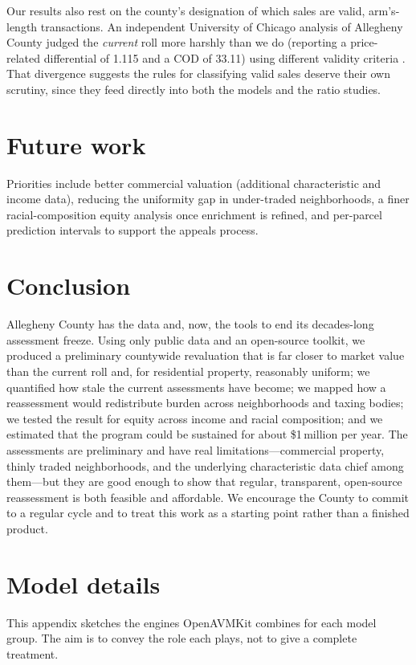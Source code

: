 \documentclass[11pt]{article}
\begin{document}
Our results also rest on the county's designation of which sales are valid,
arm's-length transactions. An independent University of Chicago analysis of
Allegheny County judged the \emph{current} roll more harshly than we do (reporting
a price-related differential of 1.115 and a COD of 33.11) using different validity
criteria \citep{berry2024}. That divergence suggests the rules for classifying
valid sales deserve their own scrutiny, since they feed directly into both the
models and the ratio studies.

\section{Future work}\label{sec:future}
Priorities include better commercial valuation (additional characteristic and
income data), reducing the uniformity gap in under-traded neighborhoods, a finer
racial-composition equity analysis once enrichment is refined, and per-parcel
prediction intervals to support the appeals process.

\section{Conclusion}
Allegheny County has the data and, now, the tools to end its decades-long
assessment freeze. Using only public data and an open-source toolkit, we produced a
preliminary countywide revaluation that is far closer to market value than the
current roll and, for residential property, reasonably uniform; we quantified how
stale the current assessments have become; we mapped how a reassessment would
redistribute burden across neighborhoods and taxing bodies; we tested the result
for equity across income and racial composition; and we estimated that the program
could be sustained for about \$1\,million per year. The assessments are preliminary
and have real limitations---commercial property, thinly traded neighborhoods, and
the underlying characteristic data chief among them---but they are good enough to
show that regular, transparent, open-source reassessment is both feasible and
affordable. We encourage the County to commit to a regular cycle and to treat this
work as a starting point rather than a finished product.

\appendix
\section{Model details}
This appendix sketches the engines OpenAVMKit combines for each model group. The
aim is to convey the role each plays, not to give a complete treatment.
\end{document}
